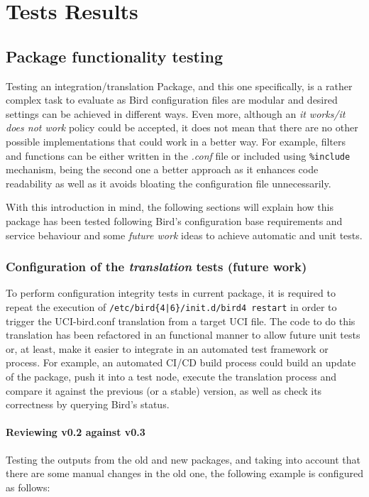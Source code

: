 \chapter{Tests Results}
\label{ch:tresults}

\section{Package functionality testing}
Testing an integration/translation Package, and this one specifically, is a rather complex task to evaluate as Bird configuration files are modular and desired settings can be achieved in different ways.
Even more, although an \textit{it works/it does not work} policy could be accepted, it does not mean that there are no other possible implementations that could work in a better way.
For example, filters and functions can be either written in the \textit{.conf} file or included using \texttt{\%include} mechanism, being the second one a better approach as it enhances code readability as well as it avoids bloating the configuration file unnecessarily.

With this introduction in mind, the following sections will explain how this package has been tested following Bird's configuration base requirements and service behaviour and some \textit{future work} ideas to achieve automatic and unit tests.


\subsection{Configuration of the \textit{translation} tests (future work)}
To perform configuration integrity tests in current package, it is required to repeat the execution of \texttt{/etc/bird\{4|6\}/init.d/bird4 restart} in order to trigger the UCI-bird.conf translation from a target UCI file. The code to do this translation has been refactored in an functional manner to allow future unit tests or, at least, make it easier to integrate in an automated test framework or process. For example, an automated CI/CD build process could build an update of the package, push it into a test node, execute the translation process and compare it against the previous (or a stable) version, as well as check its correctness by querying Bird's status.

\subsubsection{Reviewing v0.2 against v0.3}
Testing the outputs from the old and new packages, and taking into account that there are some manual changes in the old one, the following example is configured as follows:

